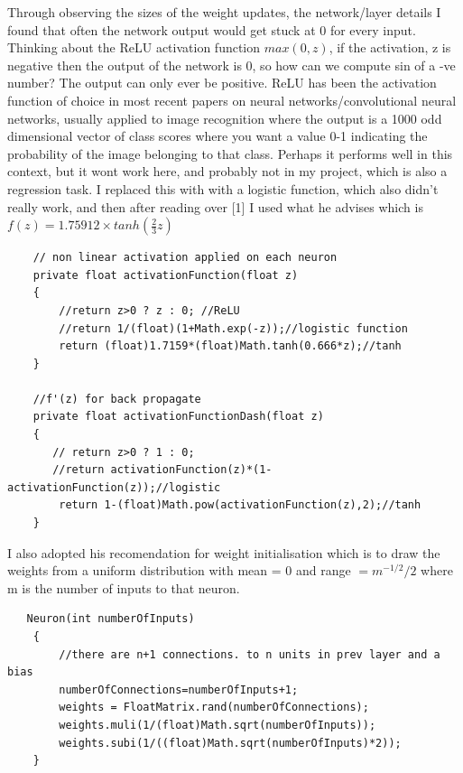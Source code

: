 \documentclass[11pt]{article} %
\begin{document}
Through observing the sizes of the weight updates, the network/layer details I found that often the network output would get stuck at 0 for every input. Thinking about the ReLU activation function $max(0,z)$, if the activation, z is negative then the output of the network is 0, so how can we compute sin of a -ve number? The output can only ever be positive. ReLU has been the activation function of choice in most recent papers on neural networks/convolutional neural networks, usually applied to image recognition where the output is a 1000 odd dimensional vector of class scores where you want a value 0-1 indicating the probability of the image belonging to that class. Perhaps it performs well in this context, but it wont work here, and probably not in my project, which is also a regression task. 
I replaced this with with a logistic function, which also didn't really work, and then after reading over [1] I used what he advises which is $f(z) = 1.75912 \times tanh(\frac{2}{3} z)$

\begin{lstlisting}
    // non linear activation applied on each neuron
    private float activationFunction(float z)
    {
        //return z>0 ? z : 0; //ReLU
        //return 1/(float)(1+Math.exp(-z));//logistic function
        return (float)1.7159*(float)Math.tanh(0.666*z);//tanh
    }
    
    //f'(z) for back propagate
    private float activationFunctionDash(float z)
    {
       // return z>0 ? 1 : 0;
       //return activationFunction(z)*(1-activationFunction(z));//logistic
        return 1-(float)Math.pow(activationFunction(z),2);//tanh
    }
\end{lstlisting}

I also adopted his recomendation for weight initialisation which is to draw the weights from a uniform distribution with mean = 0 and range $= m^{-1/2}/2$ where m is the number of inputs to that neuron. 
\begin{lstlisting}
   Neuron(int numberOfInputs)
    {
        //there are n+1 connections. to n units in prev layer and a bias
        numberOfConnections=numberOfInputs+1;
        weights = FloatMatrix.rand(numberOfConnections);
        weights.muli(1/(float)Math.sqrt(numberOfInputs));
        weights.subi(1/((float)Math.sqrt(numberOfInputs)*2));
    }
\end{lstlisting}
\end{document}
